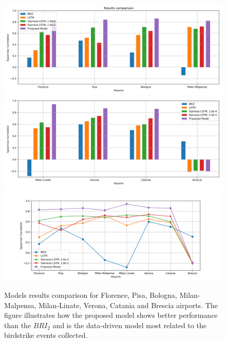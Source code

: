 \begin{figure}
	\centering
	\includegraphics[width=13.8cm]{img/comparison1.png}
	\includegraphics[width=13.8cm]{img/comparison2.png}
	\includegraphics[width=14cm]{img/comparison3_2.png}
	\caption{Models results comparison for Florence, Pisa, Bologna, Milan-Malpensa, Milan-Linate, Verona, Catania and Brescia airports. The figure illustrates how the proposed model shows better performance than the $BRI_2$ and is the data-driven model most related to the birdstrike events collected.}
	\label{comparison1}
\end{figure}
